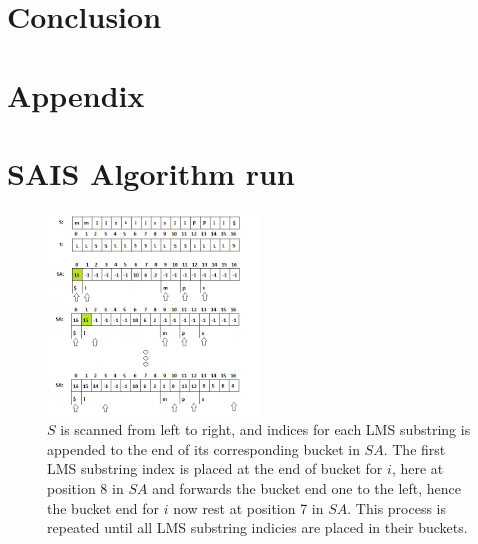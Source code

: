 \documentclass[12pt]{article} %
\begin{document}
\section{Conclusion}

\section{Appendix}




\newpage
\appendix
\label{appendix}
\section{SAIS Algorithm run}\label{SAIS Algorithm run}
\begin{figure}[H]
    \centering
    \includegraphics[width=0.5\textwidth]{SAIS_LMS2}
    \captionsetup{width=0.8\textwidth}
    \caption{$S$ is scanned from left to right, and indices for each LMS substring is appended to the end of its corresponding bucket in $SA$. The first LMS substring index is placed at the end of bucket for $i$, here at position 8 in $SA$ and forwards the bucket end one to the left, hence the bucket end for $i$ now rest at position 7 in $SA$. This process is repeated until all LMS substring indicies are placed in their buckets.}
    \label{fig:SAIS_LMS2}
\end{figure}
\end{document}
